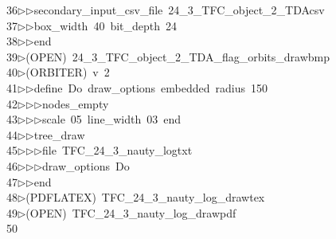 \begin{tabbing}
36\>$\triangleright$\>$\triangleright$\>secondary\_input\_csv\_file\ 24\_3\_TFC\_object\_2\_TDAcsv\ \\[0pt]
37\>$\triangleright$\>$\triangleright$\>box\_width\ 40\ bit\_depth\ 24\ \\[0pt]
38\>$\triangleright$\>$\triangleright$\>end\\[0pt]
39\>$\triangleright$\>(OPEN)\ 24\_3\_TFC\_object\_2\_TDA\_flag\_orbits\_drawbmp\\[0pt]
40\>$\triangleright$\>(ORBITER)\ v\ 2\ \\[0pt]
41\>$\triangleright$\>$\triangleright$\>define\ Do\ draw\_options\ embedded\ radius\ 150\ \\[0pt]
42\>$\triangleright$\>$\triangleright$\>$\triangleright$\>nodes\_empty\ \\[0pt]
43\>$\triangleright$\>$\triangleright$\>$\triangleright$\>scale\ 05\ line\_width\ 03\ end\ \\[0pt]
44\>$\triangleright$\>$\triangleright$\>tree\_draw\ \\[0pt]
45\>$\triangleright$\>$\triangleright$\>$\triangleright$\>file\ TFC\_24\_3\_nauty\_logtxt\ \\[0pt]
46\>$\triangleright$\>$\triangleright$\>$\triangleright$\>draw\_options\ Do\ \\[0pt]
47\>$\triangleright$\>$\triangleright$\>end\\[0pt]
48\>$\triangleright$\>(PDFLATEX)\ TFC\_24\_3\_nauty\_log\_drawtex\\[0pt]
49\>$\triangleright$\>(OPEN)\ TFC\_24\_3\_nauty\_log\_drawpdf\\[0pt]
50\>\end{tabbing}
